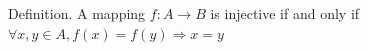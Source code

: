 \documentclass[preview]{standalone}
\begin{document}
\begin{center}
Definition. A mapping $f : A \to B$ is injective if and only if $\forall x, y \in A, f(x) = f(y) \Rightarrow x = y$
\end{center}
\end{document}
